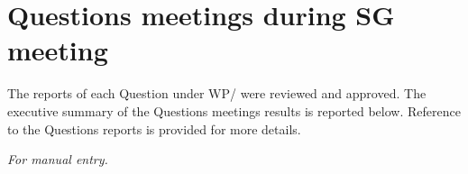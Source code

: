 
\section{Questions meetings during SG\studyGroup{} meeting}\label{questions-meetings-during-sg-meeting}

The reports of each Question under WP\workingParty/\studyGroup{} were reviewed and approved. The executive summary of the Questions meetings results is reported below. Reference to the Questions reports is provided for more details.

\textit{For manual entry.}


